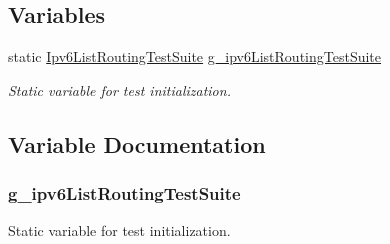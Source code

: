 \subsection*{Variables}
\begin{DoxyCompactItemize}
\item 
static \hyperlink{classIpv6ListRoutingTestSuite}{Ipv6\+List\+Routing\+Test\+Suite} \hyperlink{ipv6-list-routing-test-suite_8cc_a99ab5690201148333f48fb47262ee4b8}{g\+\_\+ipv6\+List\+Routing\+Test\+Suite}
\begin{DoxyCompactList}\small\item\em Static variable for test initialization. \end{DoxyCompactList}\end{DoxyCompactItemize}


\subsection{Variable Documentation}
\subsubsection[{\texorpdfstring{g\+\_\+ipv6\+List\+Routing\+Test\+Suite}{g_ipv6ListRoutingTestSuite}}]{ g\+\_\+ipv6\+List\+Routing\+Test\+Suite\hspace{0.3cm}{\ttfamily [static]}}\hypertarget{ipv6-list-routing-test-suite_8cc_a99ab5690201148333f48fb47262ee4b8}{}\label{ipv6-list-routing-test-suite_8cc_a99ab5690201148333f48fb47262ee4b8}


Static variable for test initialization. 

